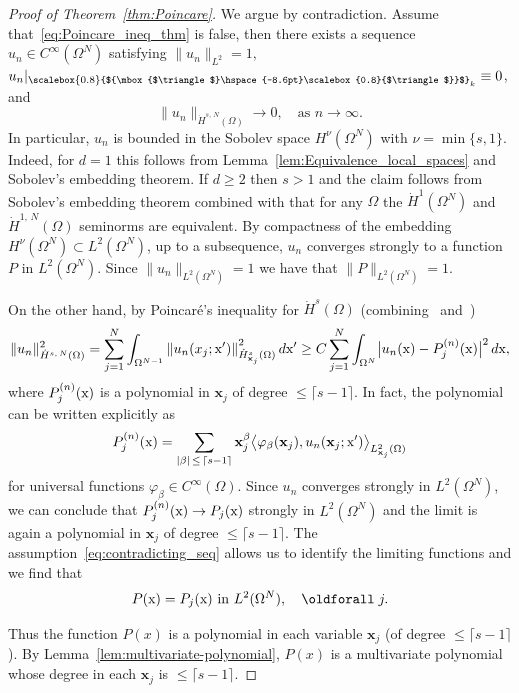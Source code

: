 \documentclass[AHL, Unicode, longabstracts, published]{cedram}
\newcommand\1{{\ensuremath {\mathds 1} }}
\newcommand{\bx}{\mathbf{x}}
\newcommand{\sx}{\textup{x}}
\newcommand{\bDelta}{{\mbox{$\triangle$}\hspace{-8.6pt}\scalebox{0.8}{$\triangle$}}}
\newcommand{\scriptbDelta}{\scalebox{0.8}{$\bDelta$}}
\renewcommand*{\forall}{\mathrel{\oldforall}}
\begin{document}
\begin{proof}[Proof of Theorem~\ref{thm:Poincare}]
We argue by contradiction. Assume that~\eqref{eq:Poincare_ineq_thm} is false, then there exists a sequence $u_n\in C^\infty(\Omega^N)$ satisfying $\|u_n\|_{L^2}=1,$ $u_n|_{\scriptbDelta_k}\equiv 0$, and
\begin{equation}\label{eq:contradicting_seq}
\|u_n\|_{\dot{H}^{s,\,N}(\Omega)}\to 0, \quad \text{as }n\to \infty.
\end{equation}
In particular, $u_n$ is bounded in the Sobolev space $H^{\nu}(\Omega^N)$ with $\nu=\min\{s, 1\}$. Indeed, for $d=1$ this follows from Lemma~\ref{lem:Equivalence_local_spaces} and Sobolev's embedding theorem. If $d\geq 2$ then $s>1$ and the claim follows from Sobolev's embedding theorem combined with that for any $\Omega$ the $\dot H^{1}(\Omega^N)$ and $\dot H^{1,\,N}(\Omega)$ seminorms are equivalent. By compactness of the embedding $H^\nu(\Omega^N) \subset L^2(\Omega^N)$, up to a subsequence, $u_n$ converges strongly to a function $P$ in $L^2(\Omega^N)$. Since $\|u_n\|_{L^2(\Omega^N)}=1$ we have that $\|P\|_{L^2(\Omega^N)}=1$.

On the other hand, by Poincaré's inequality for $\dot{H}^s(\Omega)$ (combining~\cite[Theorem~8.11]{LiebLoss_book} and~\cite[Lemma~2.2]{Hurri_etal_13})
\[
\|u_n\|_{\dot{H}^{s,\,N}(\Omega)}^2
=\sum_{j=1}^N \int_{\Omega^{N-1}}\left\|u_n(x_j; \sx')\right\|^2_{\dot{H}^s_{\bx_j}(\Omega)}d\sx'
\geq C\sum_{j=1}^N \int_{\Omega^{N}}\bigl|u_n(\sx)- P^{(n)}_j(\sx)\bigr|^2\,d\sx,
\]
where $P_j^{(n)}(\sx)$ is a polynomial in $\bx_j$ of degree $\leq \lceil s-1\rceil$. In fact, the polynomial can be written explicitly as
\begin{equation}
P_j^{(n)}(\sx) = \sum_{|\beta|\,\leq\,\lceil s-1\rceil} \bx_j^\beta \bigl\langle \varphi_\beta(\bx_j), u_n(\bx_j; \sx')\bigr\rangle_{L^2_{\bx_j}(\Omega)}
\end{equation}
for universal functions $\varphi_\beta\in C^\infty(\Omega)$. Since $u_n$ converges strongly in $L^2(\Omega^N)$, we can conclude that $P^{(n)}_j(\sx) \to P_j(\sx)$ strongly in $L^2(\Omega^N)$ and the limit is again a polynomial in $\bx_j$ of degree $\leq \lceil s-1\rceil$. The assumption~\eqref{eq:contradicting_seq} allows us to identify the limiting functions and we find that
\begin{equation*}
P(\sx)=P_j(\sx)\text{ in } L^2(\Omega^N), \quad \forall j.
\end{equation*}

Thus the function $P(x)$ is a polynomial in each variable $\bx_j$ (of degree $\leq \lceil s-1\rceil$). By Lemma~\ref{lem:multivariate-polynomial}, $P(x)$ is a multivariate polynomial whose degree in each $\bx_j$ is $\leq \lceil s-1\rceil$.



\end{proof}
\end{document}
